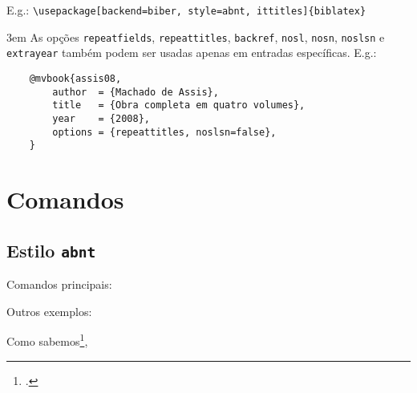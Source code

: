\documentclass[a4paper]{article}
\begin{document}
\vspace{\baselineskip}
E.g.: \verb"\usepackage[backend=biber, style=abnt, ittitles]{biblatex}"

{
\emergencystretch 3em
As opções \texttt{repeatfields}, \texttt{repeattitles}, \texttt{backref},
\texttt{nosl}, \texttt{nosn}, \texttt{noslsn} e \texttt{extrayear} também
podem ser usadas apenas em entradas específicas. E.g.:
}

\begin{verbatim}
    @mvbook{assis08,
        author  = {Machado de Assis},
        title   = {Obra completa em quatro volumes},
        year    = {2008},
        options = {repeattitles, noslsn=false},
    }
\end{verbatim}


\section{Comandos}%
\label{sec:comandos}

\subsection{Estilo \texttt{abnt}}%

Comandos principais:

\begin{example}
\cite{amaral15}
\end{example}

\begin{example}
\textcite{bosi08}
\end{example}

\begin{example}
\end{example}

\begin{example}
\cites{moretti09}{mann09}{amaral15}
\end{example}

\begin{example}
\textcites{moretti09}{mann09}{amaral15}
\end{example}

Outros exemplos:

\begin{example}
Como sabemos\footcite[Cf., e.g.,][]{assis08},
\end{example}

\begin{example}
\end{example}
\end{document}
